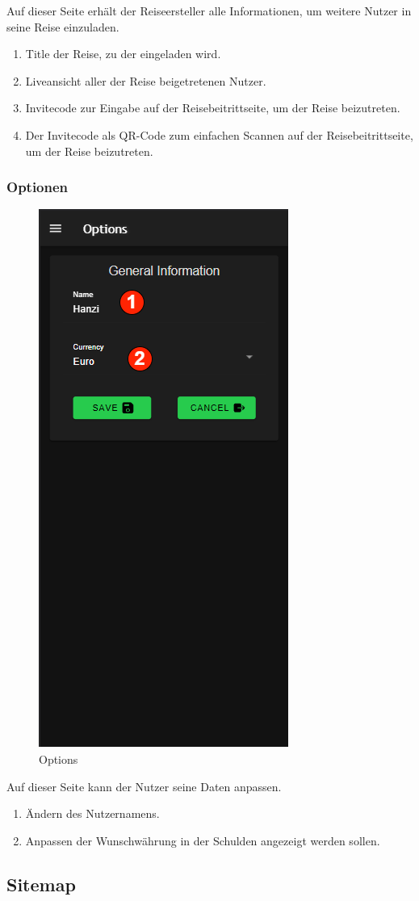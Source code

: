 Auf dieser Seite erhält der Reiseersteller alle Informationen, um weitere Nutzer in seine Reise einzuladen.

\begin{enumerate}[label=\protect\circled{\arabic*}]
	\item Title der Reise, zu der eingeladen wird.
	\item Liveansicht aller der Reise beigetretenen Nutzer.
	\item Invitecode zur Eingabe auf der Reisebeitrittseite, um der Reise beizutreten.
	\item Der Invitecode als QR-Code zum einfachen Scannen auf der Reisebeitrittseite, um der Reise beizutreten.
\end{enumerate}

\subsubsection{Optionen}\label{options}
\begin{figure}[H]
	\centering
	\includegraphics[width=0.3
		\textwidth]{img/pages_numbers/options.drawio}
	\caption[Options]{Options}
	\label{fig:options}
\end{figure}

Auf dieser Seite kann der Nutzer seine Daten anpassen.

\begin{enumerate}[label=\protect\circled{\arabic*}]
	\item Ändern des Nutzernamens.
	\item Anpassen der Wunschwährung in der Schulden angezeigt werden sollen.
\end{enumerate}


\subsection{Sitemap}


